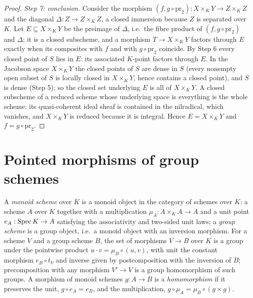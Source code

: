 \begin{proof}
  \emph{Step 7: conclusion.} Consider the morphism
  \((f, g \circ \mathrm{pr}_2) : X \times_K Y \to Z \times_K Z\) and the diagonal
  \(\Delta : Z \to Z \times_K Z\), a closed immersion because \(Z\) is separated over
  \(K\). Let \(E \subseteq X \times_K Y\) be the preimage of \(\Delta\), i.e.\ the fibre
  product of \((f, g \circ \mathrm{pr}_2)\) and \(\Delta\); it is a closed subscheme, and a
  morphism \(T \to X \times_K Y\) factors through \(E\) exactly when its composites with
  \(f\) and with \(g \circ \mathrm{pr}_2\) coincide. By Step 6 every closed point of \(S\)
  lies in \(E\): its associated \(K\)-point factors through \(E\). In the Jacobson space
  \(X \times_K Y\) the closed points of \(S\) are dense in \(S\) (every nonempty open subset
  of \(S\) is locally closed in \(X \times_K Y\), hence contains a closed point), and \(S\)
  is dense (Step 5); so the closed set underlying \(E\) is all of \(X \times_K Y\). A closed
  subscheme of a reduced scheme whose underlying space is everything is the whole scheme:
  its quasi-coherent ideal sheaf is contained in the nilradical, which vanishes, and
  \(X \times_K Y\) is reduced because it is integral. Hence \(E = X \times_K Y\) and
  \(f = g \circ \mathrm{pr}_2\).
\end{proof}

\section{Pointed morphisms of group schemes}

A \emph{monoid scheme} over \(K\) is a monoid object in the category of schemes over \(K\):
a scheme \(A\) over \(K\) together with a multiplication \(\mu_A : A \times_K A \to A\) and a
unit point \(e_A : \operatorname{Spec} K \to A\) satisfying the associativity and two-sided unit laws; a
\emph{group scheme} is a group object, i.e.\ a monoid object with an inversion morphism. For
a scheme \(V\) and a group scheme \(B\), the set of morphisms \(V \to B\) over \(K\) is a
group under the pointwise product \(u \cdot v = \mu_B \circ (u, v)\), with unit the constant
morphism \(e_B \circ t_V\) and inverse given by postcomposition with the inversion of \(B\);
precomposition with any morphism \(V' \to V\) is a group homomorphism of such groups. A
morphism of monoid schemes \(g : A \to B\) is a \emph{homomorphism} if it preserves the unit,
\(g \circ e_A = e_B\), and the multiplication,
\(g \circ \mu_A = \mu_B \circ (g \times g)\).

